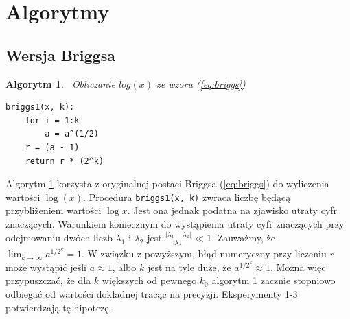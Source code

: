 \documentclass{article}
\newtheorem{alg}{Algorytm}
\begin{document}
\section{Algorytmy}
\subsection{Wersja Briggsa}
\begin{alg}\, \textsf{Obliczanie $log(x)$ ze wzoru (\ref{eq:briggs})} \label{A:alg1}
\begin{lstlisting}
briggs1(x, k):
	for i = 1:k
		a = a^(1/2)
	r = (a - 1)
	return r * (2^k)
\end{lstlisting}
\end{alg}

	Algorytm \ref{A:alg1} korzysta z oryginalnej postaci Briggsa (\ref{eq:briggs}) do wyliczenia wartości $\log(x)$. Procedura \texttt{briggs1(x, k)} zwraca liczbę będącą przybliżeniem wartości $\log{x}$. Jest ona jednak podatna na zjawisko utraty cyfr znaczących. Warunkiem koniecznym do wystąpienia utraty cyfr znaczących przy odejmowaniu dwóch liczb $\lambda_1$ i $\lambda_2$ jest $\frac{|\lambda_1-\lambda_2|}{|\lambda1|} \ll 1$. Zauważmy, że $\displaystyle{\lim_{k \to \infty}a^{1/2^k}} = 1$. W związku z powyższym, błąd numeryczny przy liczeniu $r$ może wystąpić jeśli $a\approx 1$, albo $k$ jest na tyle duże, że $a^{1/2^k} \approx 1$. Można więc przypuszczać, że dla $k$ większych od pewnego $k_0$ algorytm \ref{A:alg1} zacznie stopniowo odbiegać od wartości dokładnej tracąc na precyzji. Eksperymenty 1-3 potwierdzają tę hipotezę.

\pagebreak
\end{document}
